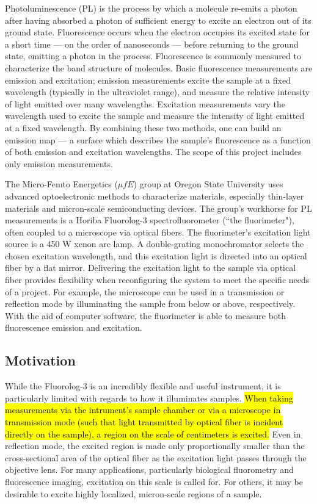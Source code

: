 Photoluminescence (PL) is the process by which a molecule re-emits a photon after having absorbed a photon of sufficient energy to excite an electron out of its ground state. Fluorescence occurs when the electron occupies its excited state for a short time  --- on the order of nanoseconds --- before returning to the ground state, emitting a photon in the process. Fluorescence is commonly measured to characterize the band structure of molecules. Basic fluorescence measurements are emission and excitation; emission measurements excite the sample at a fixed wavelength (typically in the ultraviolet range), and measure the relative intensity of light emitted over many wavelengths. Excitation measurements vary the wavelength used to excite the sample and measure the intensity of light emitted at a fixed wavelength. By combining these two methods, one can build an emission map --- a surface which describes the sample's fluorescence as a function of both emission and excitation wavelengths. The scope of this project includes only emission measurements.

The Micro-Femto Energetics ($\mu fE$) group at Oregon State University uses advanced optoelectronic methods to characterize materials, especially thin-layer materials and micron-scale semiconducting devices. The group's workhorse for PL measurements is a Horiba Fluorolog-3 spectrofluorometer (``the fluorimeter"), often coupled to a microscope via optical fibers. The fluorimeter's excitation light source is a 450 W xenon arc lamp. A double-grating monochromator selects the chosen excitation wavelength, and this excitation light is directed into an optical fiber by a flat mirror. Delivering the excitation light to the sample via optical fiber provides flexibility when reconfiguring the system to meet the specific needs of a project. For example, the microscope can be used in a transmission or reflection mode by illuminating the sample from below or above, respectively. With the aid of computer software, the fluorimeter is able to measure both fluorescence emission and excitation.

\subsection{Motivation}
While the Fluorolog-3 is an incredibly flexible and useful instrument, it is particularly limited with regards to how it illuminates samples. \hl{When taking measurements via the intrument's sample chamber or via a microscope in transmission mode (such that light transmitted by optical fiber is incident directly on the sample), a region on the scale of centimeters is excited.} Even in reflection mode, the excited region is made only proportionally smaller than the cross-sectional area of the optical fiber as the excitation light passes through the objective lens. For many applications, particularly biological fluorometry and fluorescence imaging, excitation on this scale is called for. For others, it may be desirable to excite highly localized, micron-scale regions of a sample.

